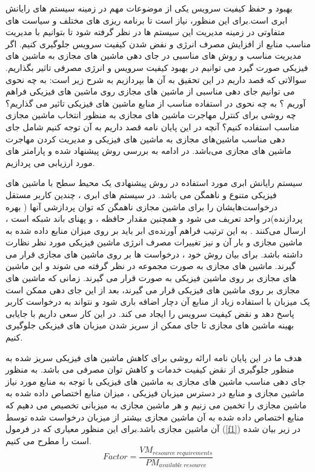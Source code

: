  بهبود و حفظ کیفیت سرویس یکی از موضوعات مهم در زمینه سیستم های رایانش ابری است.برای این منظور، نیاز است تا برنامه ریزی های مختلف و سیاست های متفاوتی در زمینه مدیریت این سیستم ها در نظر گرفته شود تا بتوانیم با مدیریت مناسب منابع از افزایش مصرف انرژی  و نفض شدن کیفیت سرویس جلوگیری کنیم. اگر مدیریت مناسب و روش های مناسبی در جای دهی ماشین های مجازی به ماشین های فیزیکی صورت گیرد می توانیم در بهبود کیفیت سرویس و انرژی مصرفی تاثیر بگذاریم. سوالاتی که قصد داریم  در این تحقیق به آن ها بپردازیم به شرح زیر است:
 به چه نحوی می توانیم جای دهی مناسبی از ماشین های مجازی روی ماشین های فیزیکی فراهم آوریم ؟
 به چه نحوی در استفاده مناسب از منابع ماشین های فیزیکی تاثیر می گذاریم؟
 چه روشی برای کنترل مهاجرت ماشین های مجازی به منظور انتخاب ماشین مجازی مناسب استفاده کنیم؟
آنچه در این پایان نامه قصد داریم به آن توجه کنیم شامل جای دهی مناسب ماشین‌های مجازی به ماشین های فیزیکی و مدیریت کردن مهاجرت ماشین های مجازی می‌باشد. 
در ادامه به بررسی روش پیشنهاد شده و پارامتر های مورد ارزیابی می پردازیم.

سیستم رایانش ابری مورد استفاده در روش پیشنهادی یک محیط سطح
 با ماشین های فیزیکی متنوع و ناهمگن می باشد. در سیستم های ابری ، چندین کاربر مستقل درخواست‌هایشان را برای
  ماشین مجازی ناهمگن که توان پردازشی آنها ( بهره پردازنده)در واحد
    تعریف می شود و همچنین مقدار حافظه ، و پهنای باند شبکه است ، ارسال می‌کنند . به این ترتیب فراهم آورنده‌ی ابر باید بر روی میزان منابع داده شده به ماشین مجازی و بار آن و نیز تغییرات مصرف انرژی ماشین فیزیکی مورد نظر نظارت داشته باشد. 
برای بیان روش خود ، درخواست ها بر روی ماشین های مجازی قرار می گیرند. ماشین های مجازی به صورت مجموعه
 در نظر گرفته می شوند و این ماشین های مجازی بر روی 
 ماشین فیزیکی به صورت 
  قرار می گیرند. زمانی که ماشین های مجازی بر روی ماشین های فیزیکی قرار می گیرند، بعد از این جای دهی ممکن است یک میزبان با استفاده زیاد از منابع آن دچار اضافه باری شود و نتواند به درخواست کاربر پاسخ دهد و نقض کیفیت سرویس را ایجاد می کند. در این کار سعی داریم با جایابی بهینه ماشین های مجازی تا جای ممکن از سریز شدن میزبان های فیزیکی جلوگیری کنیم.
  
هدف ما در این پایان نامه ارائه روشی برای کاهش ماشین های فیزیکی سریز شده به منظور جلوگیری از نقض کیفیت خدمات و کاهش توان مصرفی می باشد. به منظور جای دهی مناسب ماشین های مجازی به ماشین های فیزیکی با توجه به منابع مورد نیاز ماشین مجازی و منابع در دسترس میزبان فیزیکی ، میزان منابع اختصاص داده شده به ماشین مجازی را تخمین می زنیم و هر ماشین مجازی به میزبانی تخصیص می دهیم که منابع اختصاص داده شده به آن ماشین مجازی بیشتر از میزبان درخواست شده توسط آن ماشین مجازی باشد.برای این منظور معیاری که در فرمول
(\ref{f1})
 در زیر بیان شده است را مطرح می کنیم.
 \begin{equation}
Factor= \frac{VM_{resource\hspace{3pt} requirements}}{PM_{available\hspace{3pt} resource}}
\label{f1}
 \end{equation}
                                                                                



